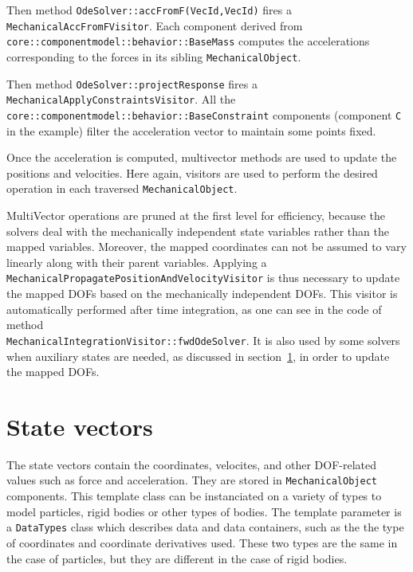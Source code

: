 Then method \texttt{OdeSolver::accFromF(VecId,VecId)} fires a \texttt{MechanicalAccFromFVisitor}. 
Each component derived from \texttt{core::componentmodel::behavior::BaseMass} computes the accelerations corresponding to the forces in its sibling \texttt{MechanicalObject}.

Then method \texttt{OdeSolver::projectResponse} fires a \texttt{MechanicalApplyConstraintsVisitor}. 
All the \texttt{core::componentmodel::behavior::BaseConstraint} components (component \texttt{C} in the example) filter the acceleration vector to maintain some points fixed.

Once the acceleration is computed, multivector methods are used to update the positions and velocities. 
Here again, visitors are used to perform the desired operation in each traversed \texttt{MechanicalObject}.

MultiVector operations are pruned at the first level for efficiency, because the solvers deal with the mechanically independent state variables rather than the mapped variables.
Moreover, the mapped coordinates can not be assumed to vary linearly along with their parent variables.
Applying a \texttt{MechanicalPropagatePositionAndVelocityVisitor} is thus necessary to update the mapped DOFs based on the mechanically independent DOFs.
This visitor is automatically performed after time integration, as one can see in the code of method \\ \texttt{MechanicalIntegrationVisitor::fwdOdeSolver}.
It is also used by some solvers when auxiliary states are needed, as discussed in section~\ref{sec:statevectors}, in order to update the mapped DOFs.



\section{State vectors} \label{sec:statevectors}
The state vectors contain the coordinates, velocites, and other DOF-related values such as force and acceleration.
They are stored in \texttt{MechanicalObject} components.
This template class can be instanciated on a variety of types to model particles, rigid bodies or other types of bodies.
The template parameter is a \texttt{DataTypes} class which describes data and data containers, such as the the type of coordinates and coordinate derivatives used.
These two types are the same in the case of particles, but they are different in the case of rigid bodies.

